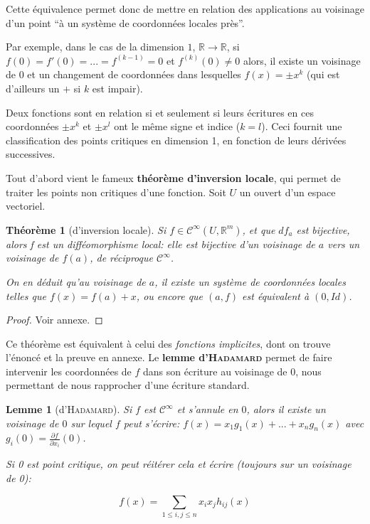 \documentclass{article}
\newcommand{\cinf}{\mathcal{C}^\infty}
\newcommand{\R}{\mathbb{R}}
\newtheorem{thm}{Théorème}
\newtheorem{lemm}{Lemme}
\theoremstyle{definition}
\begin{document}
Cette équivalence permet donc de mettre en relation des applications au voisinage d'un point ``à un système de coordonnées locales près''.

Par exemple, dans le cas de la dimension $1$, $\R\to\R$, si $f(0)=f'(0)=...=f^{(k-1)}=0$ et $f^{(k)}(0)\neq 0$ alors, il existe un voisinage de 0 et un changement de coordonnées dans lesquelles $f(x)=\pm x^k$ (qui est d'ailleurs un $+$ si $k$ est impair).

Deux fonctions sont en relation si et seulement si leurs écritures en ces coordonnées $\pm x^k$ et $\pm x^l$ ont le même signe et indice ($k=l$). Ceci fournit une classification des points critiques en dimension 1, en fonction de leurs dérivées successives.

Tout d'abord vient le fameux \textbf{théorème d'inversion locale}, qui permet de traiter les points non critiques d'une fonction. Soit $U$ un ouvert d'un espace vectoriel.

\begin{thm}[d'inversion locale]
	Si $f\in\cinf(U,\R^m)$, et que $df_a$ est bijective, alors f est un difféomorphisme local: elle est bijective d'un voisinage de $a$ vers un voisinage de $f(a)$, de réciproque $\cinf$.

	On en déduit qu'au voisinage de $a$, il existe un système de coordonnées locales telles que $f(x)=f(a)+x$, ou encore que $(a,f)$ est équivalent à $(0,Id)$.
\end{thm}

\begin{proof} Voir annexe. \end{proof}

Ce théorème est équivalent à celui des \textit{fonctions implicites}, dont on trouve l'énoncé et la preuve en annexe.
Le \textbf{lemme d'\textsc{Hadamard}} permet de faire intervenir les coordonnées de $f$ dans son écriture au voisinage de $0$, nous permettant de nous rapprocher d'une écriture standard.

\begin{lemm}[d'\textsc{Hadamard}]
	Si $f$ est $\cinf$ et s'annule en $0$, alors il existe un voisinage de $0$ sur lequel $f$ peut s'écrire: $f(x)=x_1g_1(x)+...+x_ng_n(x)$ avec $g_i(0) = \frac{\partial f}{\partial x_i}(0)$.

	Si 0 est point critique, on peut réitérer cela et écrire (toujours sur un voisinage de 0):

	$$f(x)=\sum_{1\leq i,j \leq n} x_ix_jh_{ij}(x)$$
\end{lemm}
\end{document}
